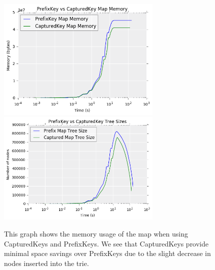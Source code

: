 \documentclass[]{article}
\begin{document}
\begin{figure}[t!]
\begin{center}
\includegraphics[width=0.7\textwidth]{figs/prefix-captured_pmap_mem.png}
\includegraphics[width=0.7\textwidth]{figs/prefix-captured_tree_size.png}
\end{center}
\caption{This graph shows the memory usage of the map when using CapturedKeys and PrefixKeys. We see that CapturedKeys provide minimal space savings over PrefixKeys due to the slight decrease in nodes inserted into the trie.}
\label{fig:prefix-captured}
\end{figure}
\end{document}
